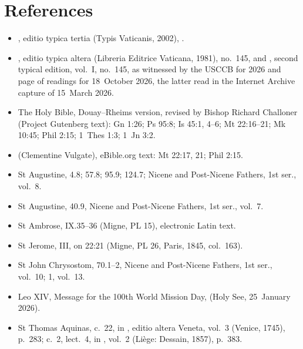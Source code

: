 \section*{References}

{\small
\begin{itemize}\setlength{\itemsep}{0.15em}\setlength{\parskip}{0pt}
\item {}, editio typica tertia (Typis Vaticanis, 2002), .
\item {}, editio typica altera (Libreria Editrice Vaticana, 1981), no.~145, and , second typical edition, vol.~I, no.~145, as witnessed by the USCCB  for 2026 and page of readings for 18~October 2026, the latter read in the Internet Archive capture of 15~March 2026.
\item The Holy Bible, Douay--Rheims version, revised by Bishop Richard Challoner (Project Gutenberg text): Gn 1:26; Ps 95:8; Is 45:1, 4--6; Mt 22:16--21; Mk 10:45; Phil 2:15; 1~Thes 1:3; 1~Jn 3:2.
\item {} (Clementine Vulgate), eBible.org text: Mt 22:17, 21; Phil 2:15.
\item St Augustine,  4.8; 57.8; 95.9; 124.7; Nicene and Post-Nicene Fathers, 1st ser., vol.~8.
\item St Augustine,  40.9, Nicene and Post-Nicene Fathers, 1st ser., vol.~7.
\item St Ambrose,  IX.35--36 (Migne, PL 15), electronic Latin text.
\item St Jerome,  III, on 22:21 (Migne, PL 26, Paris, 1845, col.~163).
\item St John Chrysostom,  70.1--2, Nicene and Post-Nicene Fathers, 1st ser., vol.~10;  1, vol.~13.
\item Leo XIV, Message for the 100th World Mission Day,  (Holy See, 25~January 2026).
\item St Thomas Aquinas,  c.~22, in , editio altera Veneta, vol.~3 (Venice, 1745), p.~283;  c.~2, lect.~4, in , vol.~2 (Li\`ege: Dessain, 1857), p.~383.
\end{itemize}
\par}
